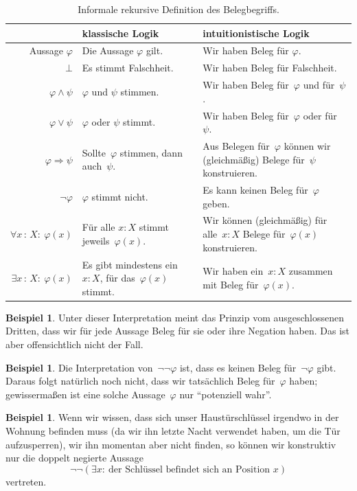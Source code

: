 \documentclass[a4paper,ngerman,12pt]{scrartcl}
\theoremstyle{definition}
\newtheorem{bsp}[defn]{Beispiel}
\theoremstyle{plain}
\theoremstyle{remark}
\renewcommand{\_}{\mathpunct{.}\,}
\newcommand{\?}{\,{:}\,}
\begin{document}
\begin{table}
  \centering
  \small
  \setlength{\extrarowheight}{0.3em}
  \begin{tabular}{@{}r|p{5.9cm}|p{6.5cm}@{}}
    & {klassische Logik} & {intuitionistische Logik}
    \\\hline
    Aussage $\varphi$ & Die Aussage $\varphi$ gilt. & Wir haben Beleg für $\varphi$. \\
    $\bot$ & Es stimmt Falschheit. & Wir haben Beleg für Falschheit. \\
    $\varphi \wedge \psi$ & $\varphi$ und $\psi$ stimmen. & Wir haben Beleg für~$\varphi$ und für~$\psi$. \\
    $\varphi \vee \psi$ & $\varphi$ oder $\psi$ stimmt. & Wir haben Beleg für~$\varphi$ oder für~$\psi$. \\
    $\varphi \Rightarrow \psi$ & Sollte~$\varphi$ stimmen, dann auch~$\psi$. &
    Aus Belegen für~$\varphi$ können wir (gleichmäßig) Belege für~$\psi$ konstruieren. \\
    $\neg\varphi$ &
      $\varphi$ stimmt nicht. &
      Es kann keinen Beleg für~$\varphi$ geben. \\
    $\forall x\?X{:}\ \varphi(x)$ & Für alle $x : X$ stimmt jeweils~$\varphi(x).$ &
      Wir können (gleichmäßig) für alle~$x : X$ Belege für~$\varphi(x)$ konstruieren. \\
    $\exists x\?X{:}\ \varphi(x)$ & \raggedright Es gibt mindestens ein~$x : X$, für das~$\varphi(x)$
    stimmt. & {\raggedright
      Wir haben ein~$x : X$ zusammen mit Beleg für~$\varphi(x).$}
  \end{tabular}
  \caption{\label{bhk}Informale rekursive Definition des Belegbegriffs.}
\end{table}

\begin{bsp}
Unter dieser Interpretation meint das Prinzip vom ausgeschlossenen Dritten, dass wir für jede
Aussage Beleg für sie oder ihre Negation haben. Das ist aber offensichtlich
nicht der Fall.
\end{bsp}

\begin{bsp}
Die Interpretation von~$\neg\neg\varphi$ ist, dass es keinen Beleg
für~$\neg\varphi$ gibt. Daraus folgt natürlich noch nicht, dass wir tatsächlich
Beleg für~$\varphi$ haben; gewissermaßen ist eine solche Aussage~$\varphi$ nur
"`potenziell wahr"'.
\end{bsp}

\begin{bsp}Wenn wir wissen, dass sich unser Haustürschlüssel irgendwo in der
Wohnung befinden muss (da wir ihn letzte Nacht verwendet haben, um die Tür
aufzusperren), wir ihn momentan aber nicht finden, so können wir konstruktiv
nur die doppelt negierte Aussage
\[ \neg\neg (\exists x{:}\ \text{der Schlüssel befindet sich an Position~$x$})
\]
vertreten.\end{bsp}
\end{document}
